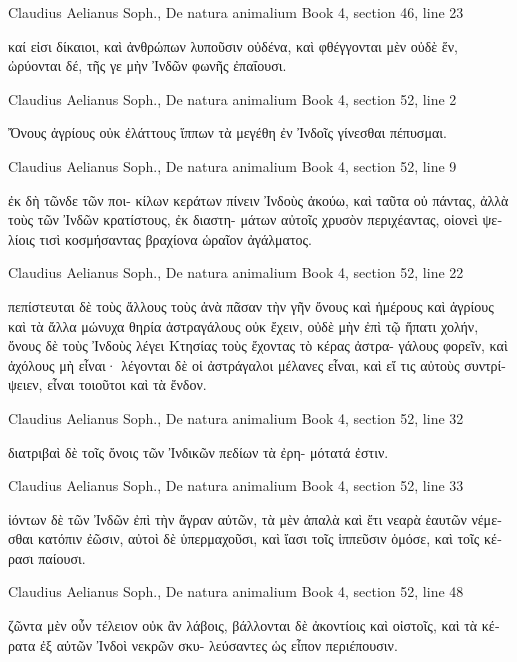\documentclass[12pt,letterpaper,twoside,final]{memoir}
\begin{document}
\begin{greek}
Claudius Aelianus Soph., De natura animalium 
Book 4, section 46, line 23

         καί εἰσι δίκαιοι, καὶ ἀνθρώπων λυποῦσιν 
οὐδένα, καὶ φθέγγονται μὲν οὐδὲ ἕν, ὠρύονται δέ, 
τῆς γε μὴν Ἰνδῶν φωνῆς ἐπαΐουσι. 



Claudius Aelianus Soph., De natura animalium 
Book 4, section 52, line 2

Ὄνους ἀγρίους οὐκ ἐλάττους ἵππων τὰ μεγέθη ἐν 
Ἰνδοῖς γίνεσθαι πέπυσμαι. 



Claudius Aelianus Soph., De natura animalium 
Book 4, section 52, line 9

                                   ἐκ δὴ τῶνδε τῶν ποι-
κίλων κεράτων πίνειν Ἰνδοὺς ἀκούω, καὶ ταῦτα οὐ 
πάντας, ἀλλὰ τοὺς τῶν Ἰνδῶν κρατίστους, ἐκ διαστη-
μάτων αὐτοῖς χρυσὸν περιχέαντας, οἱονεὶ ψελίοις τισὶ 
κοσμήσαντας βραχίονα ὡραῖον ἀγάλματος. 



Claudius Aelianus Soph., De natura animalium 
Book 4, section 52, line 22

                          πεπίστευται δὲ τοὺς ἄλλους 
τοὺς ἀνὰ πᾶσαν τὴν γῆν ὄνους καὶ ἡμέρους καὶ 
ἀγρίους καὶ τὰ ἄλλα μώνυχα θηρία ἀστραγάλους οὐκ 
ἔχειν, οὐδὲ μὴν ἐπὶ τῷ ἥπατι χολήν, ὄνους δὲ τοὺς 
Ἰνδοὺς λέγει Κτησίας τοὺς ἔχοντας τὸ κέρας ἀστρα-
γάλους φορεῖν, καὶ ἀχόλους μὴ εἶναι· λέγονται δὲ οἱ 
ἀστράγαλοι μέλανες εἶναι, καὶ εἴ τις αὐτοὺς συντρί-
ψειεν, εἶναι τοιοῦτοι καὶ τὰ ἔνδον. 



Claudius Aelianus Soph., De natura animalium 
Book 4, section 52, line 32

διατριβαὶ δὲ τοῖς ὄνοις τῶν Ἰνδικῶν πεδίων τὰ ἐρη-
μότατά ἐστιν. 



Claudius Aelianus Soph., De natura animalium 
Book 4, section 52, line 33

                 ἰόντων δὲ τῶν Ἰνδῶν ἐπὶ τὴν ἄγραν 
αὐτῶν, τὰ μὲν ἁπαλὰ καὶ ἔτι νεαρὰ ἑαυτῶν νέμεσθαι 
κατόπιν ἐῶσιν, αὐτοὶ δὲ ὑπερμαχοῦσι, καὶ ἴασι τοῖς 
ἱππεῦσιν ὁμόσε, καὶ τοῖς κέρασι παίουσι. 



Claudius Aelianus Soph., De natura animalium 
Book 4, section 52, line 48

                                    ζῶντα μὲν οὖν 
τέλειον οὐκ ἂν λάβοις, βάλλονται δὲ ἀκοντίοις καὶ 
οἰστοῖς, καὶ τὰ κέρατα ἐξ αὐτῶν Ἰνδοὶ νεκρῶν σκυ-
λεύσαντες ὡς εἶπον περιέπουσιν. 




\end{greek}
\end{document}
